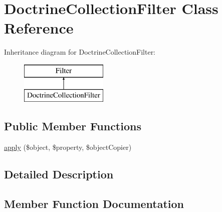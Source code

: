 \hypertarget{class_deep_copy_1_1_filter_1_1_doctrine_1_1_doctrine_collection_filter}{}\section{Doctrine\+Collection\+Filter Class Reference}
\label{class_deep_copy_1_1_filter_1_1_doctrine_1_1_doctrine_collection_filter}
Inheritance diagram for Doctrine\+Collection\+Filter\+:\begin{figure}[H]
\begin{center}
\leavevmode
\includegraphics[height=2.000000cm]{class_deep_copy_1_1_filter_1_1_doctrine_1_1_doctrine_collection_filter}
\end{center}
\end{figure}
\subsection*{Public Member Functions}
\begin{DoxyCompactItemize}
\item 
\mbox{\hyperlink{class_deep_copy_1_1_filter_1_1_doctrine_1_1_doctrine_collection_filter_a360932fe7f9488472623d76aa7da2a25}{apply}} (\$object, \$property, \$object\+Copier)
\end{DoxyCompactItemize}


\subsection{Detailed Description}


\subsection{Member Function Documentation}
\mbox{\label{class_deep_copy_1_1_filter_1_1_doctrine_1_1_doctrine_collection_filter_a360932fe7f9488472623d76aa7da2a25}} 
